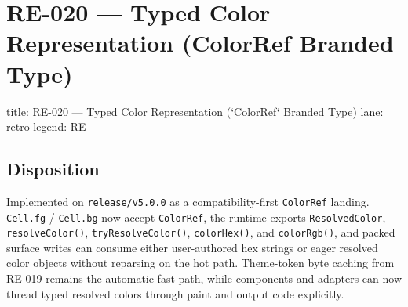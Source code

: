 \chapter{RE-020 --- Typed Color Representation (ColorRef Branded Type)}\label{record-371}

\smallskip

\begin{RecordMeta}
title: RE-020 — Typed Color Representation (`ColorRef` Branded Type)
lane: retro
legend: RE

\end{RecordMeta}

\section{Disposition}\label{record-371-disposition}

Implemented on \texttt{r\allowbreak{}e\allowbreak{}l\allowbreak{}e\allowbreak{}a\allowbreak{}s\allowbreak{}e\allowbreak{}/\allowbreak{}v\allowbreak{}5\allowbreak{}.\allowbreak{}0\allowbreak{}.\allowbreak{}0} as a compatibility-first \texttt{C\allowbreak{}o\allowbreak{}l\allowbreak{}o\allowbreak{}r\allowbreak{}R\allowbreak{}e\allowbreak{}f} landing. \texttt{C\allowbreak{}e\allowbreak{}l\allowbreak{}l\allowbreak{}.\allowbreak{}f\allowbreak{}g} / \texttt{C\allowbreak{}e\allowbreak{}l\allowbreak{}l\allowbreak{}.\allowbreak{}b\allowbreak{}g} now accept \texttt{C\allowbreak{}o\allowbreak{}l\allowbreak{}o\allowbreak{}r\allowbreak{}R\allowbreak{}e\allowbreak{}f}, the runtime exports \texttt{R\allowbreak{}e\allowbreak{}s\allowbreak{}o\allowbreak{}l\allowbreak{}v\allowbreak{}e\allowbreak{}d\allowbreak{}C\allowbreak{}o\allowbreak{}l\allowbreak{}o\allowbreak{}r}, \texttt{r\allowbreak{}e\allowbreak{}s\allowbreak{}o\allowbreak{}l\allowbreak{}v\allowbreak{}e\allowbreak{}C\allowbreak{}o\allowbreak{}l\allowbreak{}o\allowbreak{}r\allowbreak{}(\allowbreak{})}, \texttt{t\allowbreak{}r\allowbreak{}y\allowbreak{}R\allowbreak{}e\allowbreak{}s\allowbreak{}o\allowbreak{}l\allowbreak{}v\allowbreak{}e\allowbreak{}C\allowbreak{}o\allowbreak{}l\allowbreak{}o\allowbreak{}r\allowbreak{}(\allowbreak{})}, \texttt{c\allowbreak{}o\allowbreak{}l\allowbreak{}o\allowbreak{}r\allowbreak{}H\allowbreak{}e\allowbreak{}x\allowbreak{}(\allowbreak{})}, and \texttt{c\allowbreak{}o\allowbreak{}l\allowbreak{}o\allowbreak{}r\allowbreak{}R\allowbreak{}g\allowbreak{}b\allowbreak{}(\allowbreak{})}, and packed surface writes can consume either user-authored hex strings or eager resolved color objects without reparsing on the hot path. Theme-token byte caching from RE-019 remains the automatic fast path, while components and adapters can now thread typed resolved colors through paint and output code explicitly.

